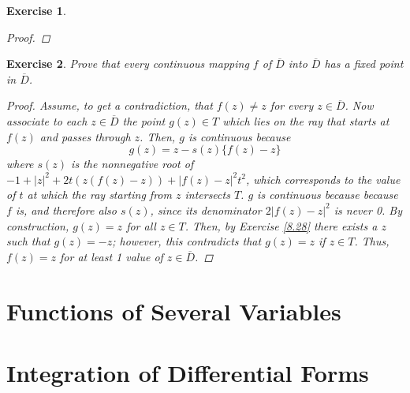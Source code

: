 \documentclass[10pt,letterpaper]{amsart}
\newtheorem{exercise}{Exercise}[section]
\theoremstyle{definition}
\theoremstyle{remark}
\numberwithin{equation}{exercise}
\begin{document}
\begin{multicols}{2}
\begin{exercise}
\begin{proof}
    \end{proof}
  \end{exercise}
  \begin{exercise}\label{8.29}
    Prove that every continuous mapping $f$ of $\overline{D}$ into $\overline{D}$ has a fixed point in $\overline{D}$.
    \begin{proof}
      Assume, to get a contradiction, that $f(z) \ne z$ for every $z \in \overline{D}$. Now associate to each $z \in \overline{D}$ the point $g(z) \in T$ which lies on the ray that starts at $f(z)$ and passes through $z$. Then, $g$ is continuous because
      \begin{equation*}
        g(z) = z - s(z) \{ f(z) - z \}
      \end{equation*}
      where $s(z)$ is the nonnegative root of $-1 + |z|^2 + 2t(z(f(z)-z)) + |f(z) - z|^2t^2$, which corresponds to the value of $t$ at which the ray starting from $z$ intersects $T$. $g$ is continuous because because $f$ is, and therefore also $s(z)$, since its denominator $2|f(z) - z|^2$ is never 0. By construction, $g(z) = z$ for all $z \in T$. Then, by Exercise \ref{8.28} there exists a $z$ such that $g(z) = -z$; however, this contradicts that $g(z) = z$ if $z \in T$. Thus, $f(z) = z$ for at least 1 value of $z \in \overline{D}$.
    \end{proof}
  \end{exercise}
  \section{Functions of Several Variables}
  \section{Integration of Differential Forms}

\end{multicols}
\end{document}
